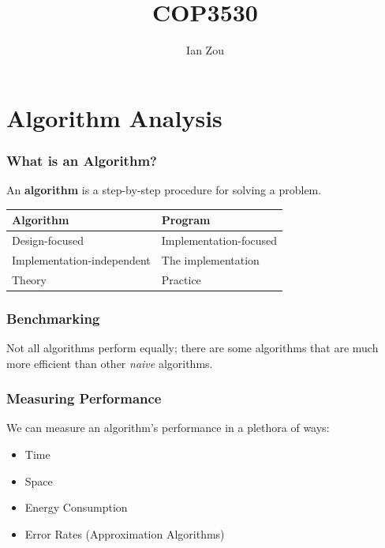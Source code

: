 \documentclass[12pt, letterpaper]{article}
\title{COP3530}
\author{Ian Zou}
\begin{document}
\maketitle

\part{Algorithm Analysis}

\section*{What is an Algorithm?}

An \textbf{algorithm} is a step-by-step procedure for solving a problem.

\begin{center}
\begin{tabular}{|l|l|}
\hline
\textbf{Algorithm}          & \textbf{Program}                                  \\ \hline
Design-focused              & Implementation-focused                            \\ \hline
Implementation-independent  & The implementation                                \\ \hline
Theory                      & Practice                                          \\ \hline
\end{tabular}
\end{center}

\section*{Benchmarking}

Not all algorithms perform equally; there are some algorithms that are much more efficient than other \textit{naive} algorithms.

\section*{Measuring Performance}

We can measure an algorithm's performance in a plethora of ways:

\begin{itemize}
    \item Time
    \item Space
    \item Energy Consumption
    \item Error Rates (Approximation Algorithms)
\end{itemize}
\end{document}
